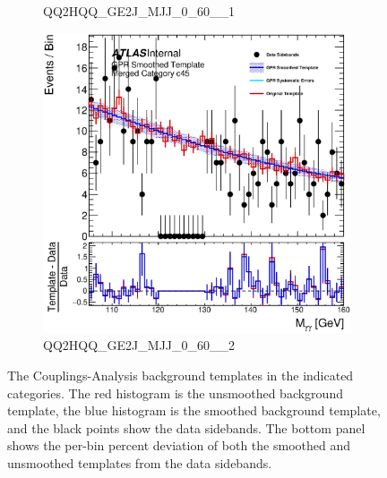 \begin{figure}
\begin{center}
\begin{subfigure}[T]{0.49\linewidth}
	\caption{QQ2HQQ\_GE2J\_MJJ\_0\_60\_\_1}
\end{subfigure}
\begin{subfigure}[T]{0.49\linewidth}
	\centering
	\includegraphics[width=\linewidth]{figures/background/gpr/coupCatTemplates/GPR_Smoothed_Plot_hmgg_c45.eps}
	\caption{QQ2HQQ\_GE2J\_MJJ\_0\_60\_\_2}
\end{subfigure}
\caption{The Couplings-Analysis background templates in the indicated categories. The red histogram is the unsmoothed background template, the blue histogram is the smoothed background template, and the black points show the data sidebands. The bottom panel shows the per-bin percent deviation of both the smoothed and unsmoothed templates from the data sidebands. }
\label{fig:gpr_coupcat_11}
\end{center}
\end{figure}

